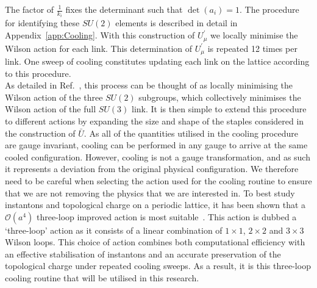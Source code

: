 The factor of $\frac{1}{k_i}$ fixes the determinant such that $\det(a_i)=1$. The procedure for identifying these $SU(2)$ elements is described in detail in Appendix~\ref{app:Cooling}. With this construction of $U_\mu^\prime$ we locally minimise the Wilson action for each link. This determination of $U_\mu^\prime$ is repeated 12 times per link. One sweep of cooling constitutes updating each link on the lattice according to this procedure.\\

As detailed in Ref.~\cite{Bonnet:2000dc}, this process can be thought of as locally minimising the Wilson action of the three $SU(2)$ subgroups, which collectively minimises the Wilson action of the full $SU(3)$ link. It is then simple to extend this procedure to different actions by expanding the size and shape of the staples considered in the construction of $\bar{U}$. As all of the quantities utilised in the cooling procedure are gauge invariant, cooling can be performed in any gauge to arrive at the same cooled configuration. However, cooling is not a gauge transformation, and as such it represents a deviation from the original physical configuration. We therefore need to be careful when selecting the action used for the cooling routine to ensure that we are not removing the physics that we are interested in. To best study instantons and topological charge on a periodic lattice, it has been shown that a $\mathcal{O}(a^4)$ three-loop  improved action is most suitable~\cite{BilsonThompson:2002jk}. This action is dubbed a `three-loop' action as it consists of a linear combination of $1\times 1$, $2\times 2$ and $3\times 3$ Wilson loops. This choice of action combines both computational efficiency with an effective stabilisation of instantons and an accurate preservation of the topological charge under repeated cooling sweeps. As a result, it is this three-loop cooling routine that will be utilised in this research.

